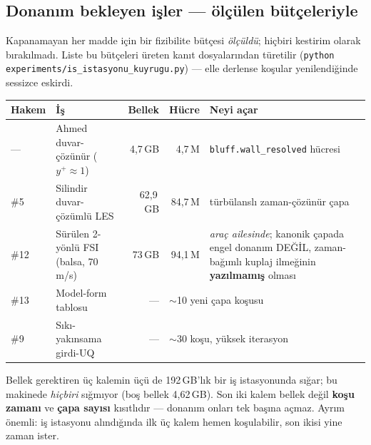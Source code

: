 \documentclass[11pt,a4paper]{article}
\begin{document}
\subsection{Donanım bekleyen işler --- ölçülen bütçeleriyle}
\label{sub:kuyruk}

Kapanamayan her madde için bir fizibilite bütçesi \emph{ölçüldü}; hiçbiri
kestirim olarak bırakılmadı. Liste bu bütçeleri üreten kanıt dosyalarından
türetilir (\texttt{python experiments/is\_istasyonu\_kuyrugu.py}) --- elle
derlense koşular yenilendiğinde sessizce eskirdi.

\begin{center}\footnotesize
\begin{tabular}{@{}llrrl@{}}
\toprule
Hakem & İş & Bellek & Hücre & Neyi açar \\
\midrule
--- & Ahmed duvar-çözünür ($y^+\!\approx\!1$) & 4{,}7\,GB & 4{,}7\,M &
  \texttt{bluff.wall\_resolved} hücresi \\
\#5 & Silindir duvar-çözümlü LES & 62{,}9\,GB & 84{,}7\,M &
  türbülanslı zaman-çözünür çapa \\
\#12 & Sürülen 2-yönlü FSI (balsa, 70\,m/s) & 73\,GB & 94{,}1\,M &
  \emph{araç ailesinde}; kanonik çapada engel donanım DEĞİL,
  zaman-bağımlı kuplaj ilmeğinin \textbf{yazılmamış} olması \\
\#13 & Model-form tablosu & --- & \multicolumn{2}{l}{$\sim$10 yeni çapa koşusu} \\
\#9 & Sıkı-yakınsama girdi-UQ & --- & \multicolumn{2}{l}{$\sim$30 koşu, yüksek iterasyon} \\
\bottomrule
\end{tabular}
\end{center}

\noindent Bellek gerektiren üç kalemin üçü de 192\,GB'lık bir iş
istasyonunda sığar; bu makinede \emph{hiçbiri} sığmıyor (boş bellek
4{,}62\,GB). Son iki kalem bellek değil \textbf{koşu zamanı} ve \textbf{çapa
sayısı} kısıtlıdır --- donanım onları tek başına açmaz. Ayrım önemli: iş
istasyonu alındığında ilk üç kalem hemen koşulabilir, son ikisi yine zaman
ister.
\end{document}
